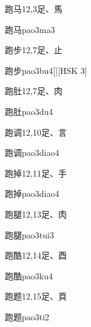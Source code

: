 \begin{entry}{跑马}{12,3}{⾜、⾺}
  \begin{phonetics}{跑马}{pao3ma3}
  \end{phonetics}
\end{entry}

\begin{entry}{跑步}{12,7}{⾜、⽌}
  \begin{phonetics}{跑步}{pao3bu4}[][HSK 3]
  \end{phonetics}
\end{entry}

\begin{entry}{跑肚}{12,7}{⾜、⾁}
  \begin{phonetics}{跑肚}{pao3du4}
  \end{phonetics}
\end{entry}

\begin{entry}{跑调}{12,10}{⾜、⾔}
  \begin{phonetics}{跑调}{pao3diao4}
  \end{phonetics}
\end{entry}

\begin{entry}{跑掉}{12,11}{⾜、⼿}
  \begin{phonetics}{跑掉}{pao3diao4}
  \end{phonetics}
\end{entry}

\begin{entry}{跑腿}{12,13}{⾜、⾁}
  \begin{phonetics}{跑腿}{pao3tui3}
  \end{phonetics}
\end{entry}

\begin{entry}{跑酷}{12,14}{⾜、⾣}
  \begin{phonetics}{跑酷}{pao3ku4}
  \end{phonetics}
\end{entry}

\begin{entry}{跑题}{12,15}{⾜、⾴}
  \begin{phonetics}{跑题}{pao3ti2}
  \end{phonetics}
\end{entry}

